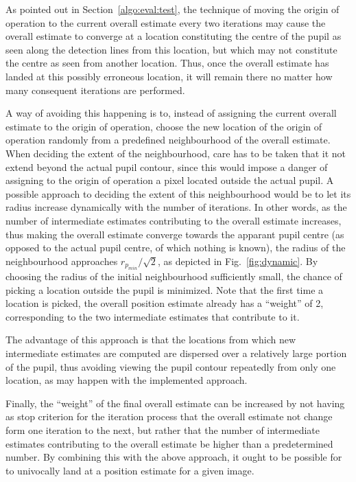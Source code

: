 As pointed out in Section~\ref{algo:eval:test}, the technique of
moving the origin of operation to the current overall estimate every
two iterations may cause the overall estimate to converge at a
location constituting the centre of the pupil as seen along the
detection lines from this location, but which may not constitute the
centre as seen from another location.  Thus, once the overall
estimate has landed at this possibly erroneous location, it will
remain there no matter how many consequent iterations are performed.

A way of avoiding this happening is to, instead of assigning the
current overall estimate to the origin of operation, choose the new
location of the origin of operation randomly from a predefined
neighbourhood of the overall estimate.  When deciding the extent of
the neighbourhood, care has to be taken that it not extend beyond the
actual pupil contour, since this would impose a danger of assigning to
the origin of operation a pixel located outside the actual pupil.  A
possible approach to deciding the extent of this neighbourhood would
be to let its radius increase dynamically with the number of
iterations.  In other words, as the number of intermediate estimates
contributing to the overall estimate increases, thus making the
overall estimate converge towards the apparant pupil centre (as
opposed to the actual pupil centre, of which nothing is known), the
radius of the neighbourhood approaches $r_{p_{min}}/\sqrt{2}$, as
depicted in Fig.~\ref{fig:dynamic}.  By choosing the radius of the
initial neighbourhood sufficiently small, the chance of picking a
location outside the pupil is minimized.  Note that the first time a
location is picked, the overall position estimate already has a
``weight'' of 2, corresponding to the two intermediate estimates that
contribute to it.

The advantage of this approach is that the locations from which new
intermediate estimates are computed are dispersed over a relatively
large portion of the pupil, thus avoiding viewing the pupil contour
repeatedly from only one location, as may happen with the implemented
approach.

Finally, the ``weight'' of the final overall estimate can be increased
by not having as stop criterion for the iteration process that the
overall estimate not change form one iteration to the next, but rather
that the number of intermediate estimates contributing to the overall
estimate be higher than a predetermined number.  By combining this
with the above approach, it ought to be possible for {\octopus} to
univocally land at a position estimate for a given image.

